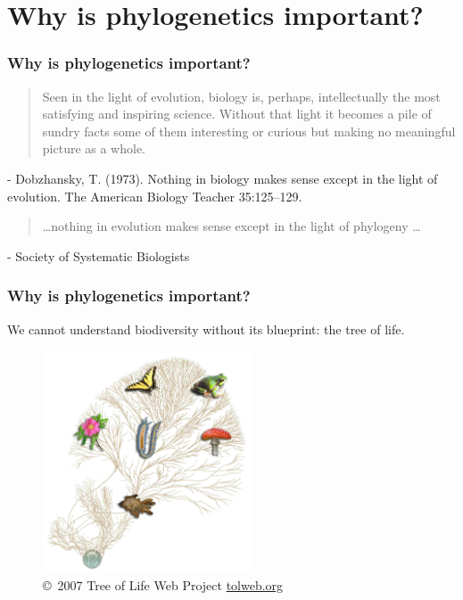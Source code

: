 \section{Why is phylogenetics important?}

\begin{frame}
    \frametitle{Why is phylogenetics important?}
    \begin{quote}
    Seen in the light of evolution, biology is, perhaps, intellectually the
    most satisfying and inspiring science. Without that light it becomes a pile
    of sundry facts some of them interesting or curious but making no
    meaningful picture as a whole.
    \end{quote}

    \myHangIndent
    - Dobzhansky, T. (1973). Nothing in biology makes sense except in the light
    of evolution. The American Biology Teacher 35:125--129.

    \bigskip

    \begin{quote}
    \ldots nothing in evolution makes sense except in the light of phylogeny \ldots
    \end{quote}

    \myHangIndent
    - Society of Systematic Biologists
\end{frame}

\begin{frame}
    \frametitle{Why is phylogenetics important?}
    We cannot understand biodiversity without its blueprint: the tree of life.
    \begin{figure}
        \begin{center}
        \includegraphics[width=0.55\textwidth]{../images/treeoflife.jpg}
        \caption{\tiny \copyright~2007 Tree of Life Web Project \href{http://tolweb.org/tree/}{tolweb.org}}
        \end{center}
    \end{figure}
\end{frame}

